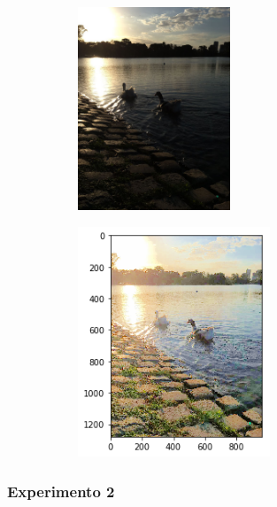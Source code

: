\documentclass[10pt, a4paper]{article}
\begin{document}
\begin{figure}[H]	
	\centering
    \begin{subfigure}{0.5\textwidth}
	\centering
        \includegraphics[width=0.5\textwidth]{patitos1.jpg}
    \end{subfigure}\hfill
    \begin{subfigure}{0.5\textwidth}
    	\centering
        \includegraphics[width=0.63\textwidth]{patitosclaro.png}
    \end{subfigure}\hfill	
\end{figure}

\subsubsection{Experimento 2}
\end{document}
